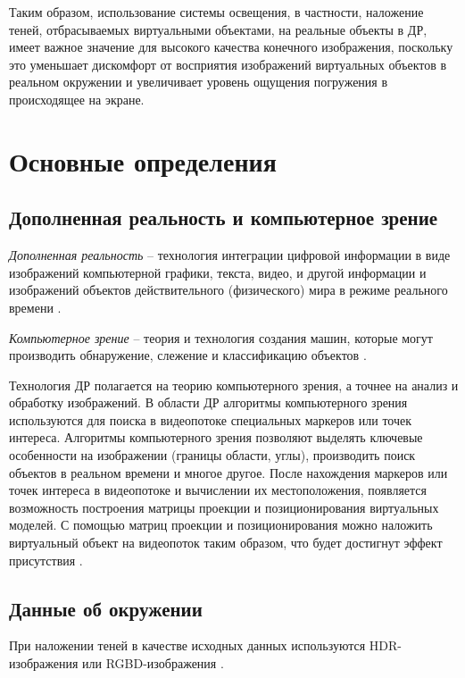 Таким образом, использование системы освещения, в частности, наложение теней, отбрасываемых виртуальными объектами, на реальные объекты в ДР, имеет важное значение для высокого качества конечного изображения, поскольку это уменьшает дискомфорт от восприятия изображений виртуальных объектов в реальном окружении и увеличивает уровень ощущения погружения в происходящее на экране.

\section{Основные определения}

\subsection{Дополненная реальность и компьютерное зрение}

\textit{Дополненная реальность} -- технология интеграции цифровой информации в виде изображений компьютерной графики, текста, видео, и другой информации и изображений объектов действительного (физического) мира в режиме реального времени \cite{tech-ar}.

\textit{Компьютерное зрение} -- теория и технология создания машин, которые могут производить обнаружение, слежение и классификацию объектов \cite{comp_vision}. 

Технология ДР полагается на теорию компьютерного зрения, а точнее на анализ и обработку изображений. В области
ДР алгоритмы компьютерного зрения используются для поиска в видеопотоке специальных маркеров или точек интереса. Алгоритмы компьютерного зрения позволяют выделять ключевые особенности на изображении (границы области, углы), производить поиск объектов в реальном времени и многое другое. После нахождения маркеров или точек интереса в видеопотоке и вычислении их местоположения, появляется возможность построения матрицы проекции и позиционирования виртуальных моделей. С помощью матриц проекции и позиционирования можно наложить виртуальный объект на видеопоток таким образом, что будет достигнут эффект присутствия \cite{tech-ar}.

\subsection{Данные об окружении}

При наложении теней в качестве исходных данных используются HDR-изображения или RGBD-изображения \cite{debevec2008rendering} \cite{sns_tras}.

